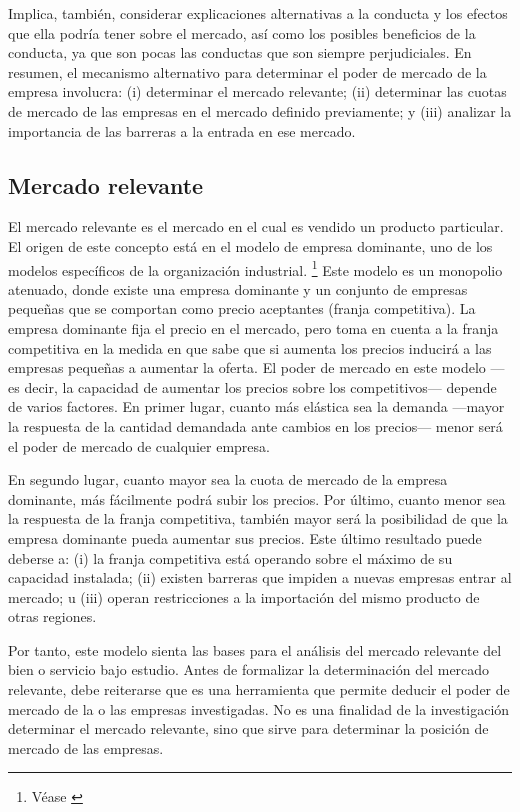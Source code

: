 \documentclass[
  12pt,
  spanish,
]{book}
\begin{document}
Implica, también, considerar explicaciones alternativas a la conducta y
los efectos que ella podría tener sobre el mercado, así como los
posibles beneficios de la conducta, ya que son pocas las conductas que
son siempre perjudiciales. En resumen, el mecanismo alternativo para
determinar el poder de mercado de la empresa involucra: (i) determinar
el mercado relevante; (ii) determinar las cuotas de mercado de las
empresas en el mercado definido previamente; y (iii) analizar la
importancia de las barreras a la entrada en ese mercado.

\hypertarget{mercado-relevante}{%
\subsection{Mercado relevante}\label{mercado-relevante}}

El mercado relevante es el mercado en el cual es vendido un producto
particular. El origen de este concepto está en el modelo de empresa
dominante, uno de los modelos específicos de la organización industrial.
\footnote{Véase \citet{Landes1981}} Este modelo es un monopolio
atenuado, donde existe una empresa dominante y un conjunto de empresas
pequeñas que se comportan como precio aceptantes (franja competitiva).
La empresa dominante fija el precio en el mercado, pero toma en cuenta a
la franja competitiva en la medida en que sabe que si aumenta los
precios inducirá a las empresas pequeñas a aumentar la oferta. El poder
de mercado en este modelo ---es decir, la capacidad de aumentar los
precios sobre los competitivos--- depende de varios factores. En primer
lugar, cuanto más elástica sea la demanda ---mayor la respuesta de la
cantidad demandada ante cambios en los precios--- menor será el poder de
mercado de cualquier empresa.

En segundo lugar, cuanto mayor sea la cuota de mercado de la empresa
dominante, más fácilmente podrá subir los precios. Por último, cuanto
menor sea la respuesta de la franja competitiva, también mayor será la
posibilidad de que la empresa dominante pueda aumentar sus precios. Este
último resultado puede deberse a: (i) la franja competitiva está
operando sobre el máximo de su capacidad instalada; (ii) existen
barreras que impiden a nuevas empresas entrar al mercado; u (iii) operan
restricciones a la importación del mismo producto de otras regiones.

Por tanto, este modelo sienta las bases para el análisis del mercado
relevante del bien o servicio bajo estudio. Antes de formalizar la
determinación del mercado relevante, debe reiterarse que es una
herramienta que permite deducir el poder de mercado de la o las empresas
investigadas. No es una finalidad de la investigación determinar el
mercado relevante, sino que sirve para determinar la posición de mercado
de las empresas.
\end{document}
